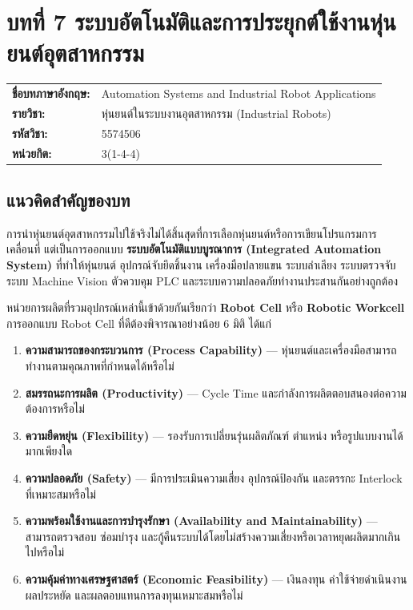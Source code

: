 \section{บทที่ 7 ระบบอัตโนมัติและการประยุกต์ใช้งานหุ่นยนต์อุตสาหกรรม}

\begin{tabularx}{\textwidth}{@{}L{0.24\textwidth}Y@{}}
\textbf{ชื่อบทภาษาอังกฤษ:} & Automation Systems and Industrial Robot Applications \\
\textbf{รายวิชา:} & หุ่นยนต์ในระบบงานอุตสาหกรรม (Industrial Robots) \\
\textbf{รหัสวิชา:} & 5574506 \\
\textbf{หน่วยกิต:} & 3(1-4-4) \\
\end{tabularx}

\subsection{แนวคิดสำคัญของบท}

การนำหุ่นยนต์อุตสาหกรรมไปใช้จริงไม่ได้สิ้นสุดที่การเลือกหุ่นยนต์หรือการเขียนโปรแกรมการเคลื่อนที่ แต่เป็นการออกแบบ \textbf{ระบบอัตโนมัติแบบบูรณาการ (Integrated Automation System)} ที่ทำให้หุ่นยนต์ อุปกรณ์จับยึดชิ้นงาน เครื่องมือปลายแขน ระบบลำเลียง ระบบตรวจจับ ระบบ Machine Vision ตัวควบคุม PLC และระบบความปลอดภัยทำงานประสานกันอย่างถูกต้อง

หน่วยการผลิตที่รวมอุปกรณ์เหล่านี้เข้าด้วยกันเรียกว่า \textbf{Robot Cell} หรือ \textbf{Robotic Workcell} การออกแบบ Robot Cell ที่ดีต้องพิจารณาอย่างน้อย 6 มิติ ได้แก่

\begin{enumerate}
    \item \textbf{ความสามารถของกระบวนการ (Process Capability)} — หุ่นยนต์และเครื่องมือสามารถทำงานตามคุณภาพที่กำหนดได้หรือไม่
    \item \textbf{สมรรถนะการผลิต (Productivity)} — Cycle Time และกำลังการผลิตตอบสนองต่อความต้องการหรือไม่
    \item \textbf{ความยืดหยุ่น (Flexibility)} — รองรับการเปลี่ยนรุ่นผลิตภัณฑ์ ตำแหน่ง หรือรูปแบบงานได้มากเพียงใด
    \item \textbf{ความปลอดภัย (Safety)} — มีการประเมินความเสี่ยง อุปกรณ์ป้องกัน และตรรกะ Interlock ที่เหมาะสมหรือไม่
    \item \textbf{ความพร้อมใช้งานและการบำรุงรักษา (Availability and Maintainability)} — สามารถตรวจสอบ ซ่อมบำรุง และกู้คืนระบบได้โดยไม่สร้างความเสี่ยงหรือเวลาหยุดผลิตมากเกินไปหรือไม่
    \item \textbf{ความคุ้มค่าทางเศรษฐศาสตร์ (Economic Feasibility)} — เงินลงทุน ค่าใช้จ่ายดำเนินงาน ผลประหยัด และผลตอบแทนการลงทุนเหมาะสมหรือไม่
\end{enumerate}

